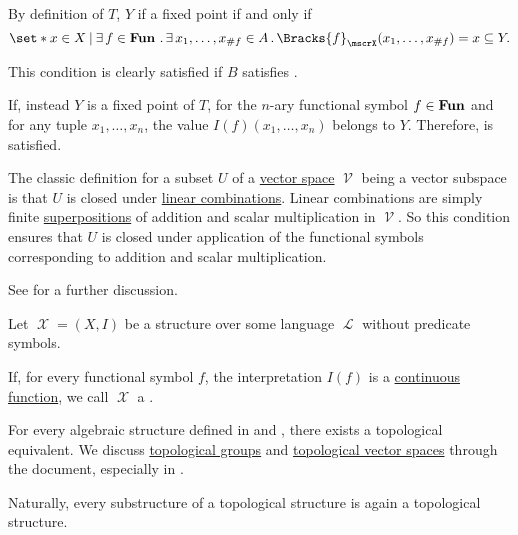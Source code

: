 \begin{defproof}
   By definition of \( T \), \( Y \) if a fixed point if and only if
  \begin{equation*}
    \set*{ x \in X \given \qexists{f \in \boldop{Fun}} \qexists{x_1, \ldots, x_{\#f} \in A} \Bracks{f}_\mscrX(x_1, \ldots, x_{\#f}) = x } \subseteq Y.
  \end{equation*}

  This condition is clearly satisfied if \( B \) satisfies .

   If, instead \( Y \) is a fixed point of \( T \), for the \( n \)-ary functional symbol \( f \in \operatorname{\mathbf{Fun}} \) and for any tuple \( x_1, \ldots, x_n \), the value \( I(f)(x_1, \ldots, x_n) \) belongs to \( Y \). Therefore,  is satisfied.
\end{defproof}

\begin{example}\label{ex:def:first_order_substructure/vector_space}
  The classic definition for a subset \( U \) of a \hyperref[def:vector_space]{vector space} \( \mscrV \) being a vector subspace is that \( U \) is closed under \hyperref[rem:linear_combinations]{linear combinations}. Linear combinations are simply finite \hyperref[def:multi_valued_function/superposition]{superpositions} of addition and scalar multiplication in \( \mscrV \). So this condition ensures that \( U \) is closed under application of the functional symbols corresponding to addition and scalar multiplication.

  See  for a further discussion.
\end{example}

\begin{remark}\label{rem:topological_first_order_structures}
  Let \( \mscrX = (X, I) \) be a structure over some language \( \mscrL \) without predicate symbols.

  If, for every functional symbol \( f \), the interpretation \( I(f) \) is a \hyperref[def:global_continuity]{continuous function}, we call \( \mscrX \) a .

  For every algebraic structure defined in  and , there exists a topological equivalent. We discuss \hyperref[def:topological_group]{topological groups} and \hyperref[def:topological_vector_space]{topological vector spaces} through the document, especially in .

  Naturally, every substructure of a topological structure is again a topological structure.
\end{remark}

